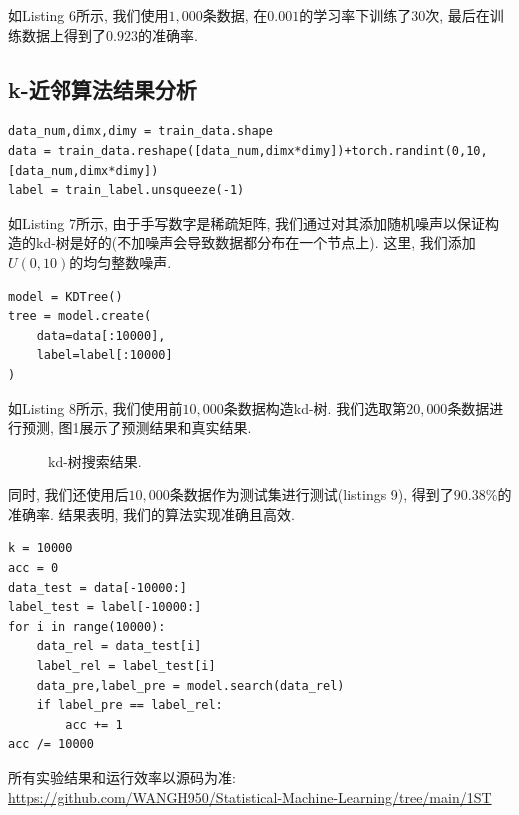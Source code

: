 如Listing 6所示, 我们使用$1,000$条数据, 在$0.001$的学习率下训练了$30$次, 最后在训练数据上得到了$0.923$的准确率.
\subsection{k-近邻算法结果分析}
\begin{lstlisting}[caption = MNIST数据预处理]
data_num,dimx,dimy = train_data.shape
data = train_data.reshape([data_num,dimx*dimy])+torch.randint(0,10,[data_num,dimx*dimy])
label = train_label.unsqueeze(-1)
\end{lstlisting}

如Listing 7所示, 由于手写数字是稀疏矩阵, 我们通过对其添加随机噪声以保证构造的kd-树是好的(不加噪声会导致数据都分布在一个节点上). 
这里, 我们添加$U(0,10)$的均匀整数噪声.
\begin{lstlisting}
model = KDTree()
tree = model.create(
    data=data[:10000],
    label=label[:10000]
)
\end{lstlisting}

如Listing 8所示, 我们使用前$10,000$条数据构造kd-树. 我们选取第$20,000$条数据进行预测, 图1展示了预测结果和真实结果.
\begin{figure}[htpb]
    \centering
    \caption{kd-树搜索结果.}
    \label{figure1}
\end{figure}

同时, 我们还使用后$10,000$条数据作为测试集进行测试(listings 9), 得到了$90.38\%$的准确率. 结果表明, 我们的算法实现准确且高效.
\begin{lstlisting}
k = 10000
acc = 0
data_test = data[-10000:]
label_test = label[-10000:]
for i in range(10000):
    data_rel = data_test[i]
    label_rel = label_test[i]
    data_pre,label_pre = model.search(data_rel)
    if label_pre == label_rel:
        acc += 1
acc /= 10000
\end{lstlisting}

所有实验结果和运行效率以源码为准: \\
\url{https://github.com/WANGH950/Statistical-Machine-Learning/tree/main/1ST }
